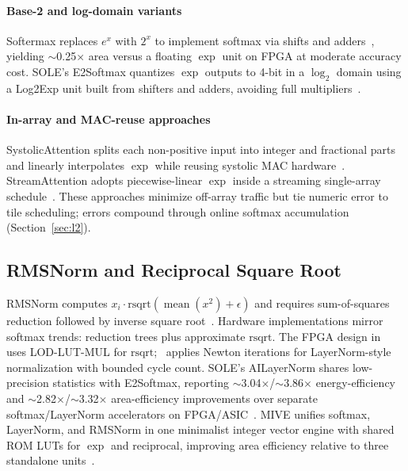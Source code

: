 \documentclass[conference]{IEEEtran}
\begin{document}
\paragraph{Base-2 and log-domain variants}
Softermax replaces $e^x$ with $2^x$ to implement softmax via shifts and adders~\cite{sun2022softmax}, yielding $\sim$0.25$\times$ area versus a floating $\exp$ unit on FPGA at moderate accuracy cost.
SOLE's E2Softmax quantizes $\exp$ outputs to 4-bit in a $\log_2$ domain using a Log2Exp unit built from shifters and adders, avoiding full multipliers~\cite{sole2025}.

\paragraph{In-array and MAC-reuse approaches}
SystolicAttention splits each non-positive input into integer and fractional parts and linearly interpolates $\exp$ while reusing systolic MAC hardware~\cite{lin2025systolicattention,koca2023exp}.
StreamAttention adopts piecewise-linear $\exp$ inside a streaming single-array schedule~\cite{streamattention2025}.
These approaches minimize off-array traffic but tie numeric error to tile scheduling; errors compound through online softmax accumulation (Section~\ref{sec:l2}).

\subsection{RMSNorm and Reciprocal Square Root}
\label{sec:l3-rmsnorm}

RMSNorm computes $x_i \cdot \mathrm{rsqrt}(\operatorname{mean}(x^2)+\epsilon)$ and requires sum-of-squares reduction followed by inverse square root~\cite{zhang2019root}.
Hardware implementations mirror softmax trends: reduction trees plus approximate $\mathrm{rsqrt}$.
The FPGA design in~\cite{softmaxrmsnorm2026} uses LOD-LUT-MUL for $\mathrm{rsqrt}$;~\cite{guaranteednorm2026} applies Newton iterations for LayerNorm-style normalization with bounded cycle count.
SOLE's AILayerNorm shares low-precision statistics with E2Softmax, reporting $\sim$3.04$\times$/$\sim$3.86$\times$ energy-efficiency and $\sim$2.82$\times$/$\sim$3.32$\times$ area-efficiency improvements over separate softmax/LayerNorm accelerators on FPGA/ASIC~\cite{sole2025}.
MIVE unifies softmax, LayerNorm, and RMSNorm in one minimalist integer vector engine with shared ROM LUTs for $\exp$ and reciprocal, improving area efficiency relative to three standalone units~\cite{mive2026}.
\end{document}
